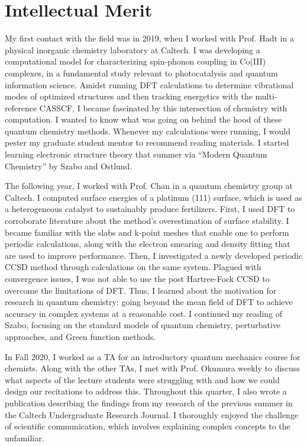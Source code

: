 \documentclass[11pt]{article} %
\begin{document}
\section{Intellectual Merit}
My first contact with the field was in 2019, when I worked with Prof. Hadt in a physical inorganic chemistry laboratory at Caltech. I was developing a computational model for characterizing spin-phonon coupling in Co(III) complexes, in a fundamental study relevant to photocatalysis and quantum information science. Amidst running DFT calculations to determine vibrational modes of optimized structures and then tracking energetics with the multi-reference CASSCF, I became fascinated by this intersection of chemistry with computation. I wanted to know what was going on behind the hood of these quantum chemistry methods. Whenever my calculations were running, I would pester my graduate student mentor to recommend reading materials. I started learning electronic structure theory that summer via “Modern Quantum Chemistry” by Szabo and Ostlund.

The following year, I worked with Prof. Chan in a quantum chemistry group at Caltech. I computed surface energies of a platinum (111) surface, which is used as a heterogeneous catalyst to sustainably produce fertilizers. First, I used DFT to corroborate literature about the method's overestimation of surface stability. I became familiar with the slabs and k-point meshes that enable one to perform periodic calculations, along with the electron smearing and density fitting that are used to improve performance. Then, I investigated a newly developed periodic CCSD method through calculations on the same system. Plagued with convergence issues, I was not able to use the post Hartree-Fock CCSD to overcome the limitations of DFT. Thus, I learned about the motivation for research in quantum chemistry: going beyond the mean field of DFT to achieve accuracy in complex systems at a reasonable cost. I continued my reading of Szabo, focusing on the standard models of quantum chemistry, perturbative approaches, and Green function methods.

In Fall 2020, I worked as a TA for an introductory quantum mechanics course for chemists. Along with the other TAs, I met with Prof. Okumura weekly to discuss what aspects of the lecture students were struggling with and how we could design our recitations to address this. Throughout this quarter, I also wrote a publication describing the findings from my research of the previous summer in the Caltech Undergraduate Research Journal. I thoroughly enjoyed the challenge of scientific communication, which involves explaining complex concepts to the unfamiliar.
\end{document}
